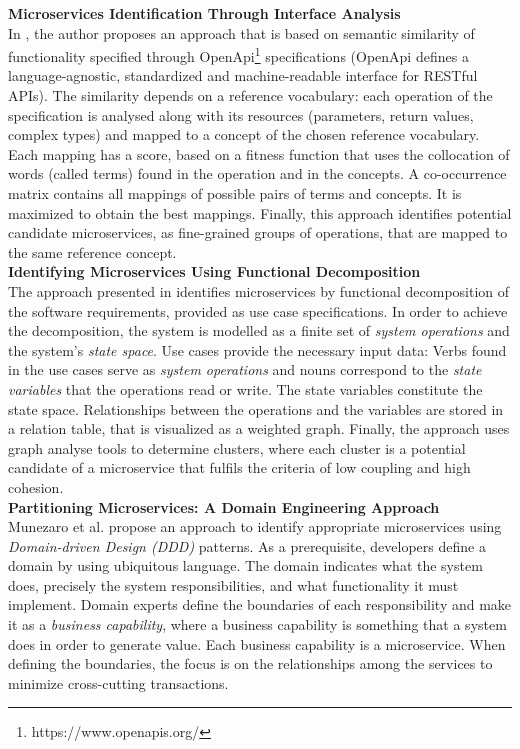 \noindent
\textbf{Microservices Identification Through Interface Analysis   } \\
In \cite{interfaceAnalysisBaresi}, the author proposes an approach that is based on semantic similarity of functionality specified through OpenApi\footnote{https://www.openapis.org/} specifications (OpenApi defines a language-agnostic, standardized and machine-readable interface for RESTful APIs). The similarity depends on a reference vocabulary: each operation of the specification is analysed along with its resources (parameters, return values, complex types) and mapped to a concept of the chosen reference vocabulary. Each mapping has a score, based on a fitness function that uses the collocation of words (called terms) found in the operation and in the concepts. A co-occurrence matrix contains all mappings of possible pairs of terms and concepts. It is maximized to obtain the best mappings. Finally, this approach identifies potential candidate microservices, as fine-grained groups of operations, that are mapped to the same reference concept. \\


\noindent
\textbf{Identifying Microservices Using Functional Decomposition  } \\
The approach presented in \cite{FunctionalDecompositionHeinrich} identifies microservices by functional decomposition of the software requirements, provided as use case specifications. In order to achieve the decomposition, the system is  modelled as a finite set of \textit{system operations} and the system's \textit{state space}. Use cases provide the necessary input data: Verbs found in the use cases serve as \textit{system operations} and nouns correspond to the \textit{state variables} that the operations read or write. The state variables constitute the state space. Relationships between the operations and the variables are stored in a relation table, that is visualized as a weighted graph. Finally, the approach uses graph analyse tools to determine clusters, where each cluster is a potential candidate of a microservice that fulfils the criteria of low coupling and high cohesion. \\



\noindent
\textbf{Partitioning Microservices: A Domain Engineering Approach } \\
Munezaro et al. \cite{DomainEngineeringMunezero} propose an approach to identify appropriate microservices using \textit{Domain-driven Design (DDD)} patterns. As a prerequisite, developers define a domain by using ubiquitous language. The domain indicates what the system does, precisely the system responsibilities, and what functionality it must implement. Domain experts define the boundaries of each responsibility and make it as a \textit{business capability}, where a business capability is something that a system does in order to generate value. Each business capability is a microservice. When defining the boundaries, the focus is on the relationships among the services to minimize cross-cutting transactions. \\

